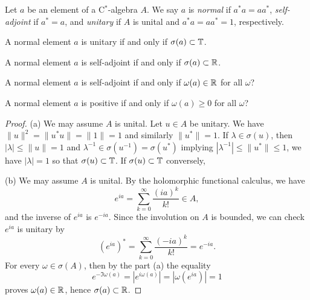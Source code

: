 \documentclass{../../large}
\begin{document}
\begin{prb}
Let $a$ be an element of a C$^*$-algebra $A$.
We say $a$ is \emph{normal} if $a^*a=aa^*$, \emph{self-adjoint} if $a^*=a$, and \emph{unitary} if $A$ is unital and $a^*a=aa^*=1$, respectively.
\begin{parts}
\item A normal element $a$ is unitary if and only if $\sigma(a)\subset\mathbb{T}$.
\item A normal element $a$ is self-adjoint if and only if $\sigma(a)\subset\mathbb{R}$.
\item A normal element $a$ is self-adjoint if and only if $\omega(a)\in\mathbb{R}$ for all $\omega$?
\item A normal element $a$ is positive if and only if $\omega(a)\ge0$ for all $\omega$?
\end{parts}
\end{prb}
\begin{proof}
(a)
We may assume $A$ is unital.
Let $u\in A$ be unitary.
We have $\|u\|^2=\|u^*u\|=\|1\|=1$ and similarly $\|u^*\|=1$.
If $\lambda\in\sigma(u)$, then $|\lambda|\le\|u\|=1$ and $\lambda^{-1}\in\sigma(u^{-1})=\sigma(u^*)$ implying $|\lambda^{-1}|\le\|u^*\|\le1$, we have $|\lambda|=1$ so that $\sigma(u)\subset\mathbb{T}$.
If $\sigma(u)\subset\mathbb{T}$ conversely,

(b)
We may assume $A$ is unital.
By the holomorphic functional calculus, we have
\[e^{ia}=\sum_{k=0}^\infty\frac{(ia)^k}{k!}\in A,\]
and the inverse of $e^{ia}$ is $e^{-ia}$.
Since the involution on $A$ is bounded, we can check $e^{ia}$ is unitary by
\[(e^{ia})^*=\sum_{k=0}^\infty\frac{(-ia)^k}{k!}=e^{-ia}.\]
For every $\omega\in\sigma(A)$, then by the part (a) the equality
\[e^{-\Im\omega(a)}=|e^{i\omega(a)}|=|\omega(e^{ia})|=1\]
proves $\omega(a)\in\mathbb{R}$, hence $\sigma(a)\subset\mathbb{R}$.
\end{proof}
\end{document}
